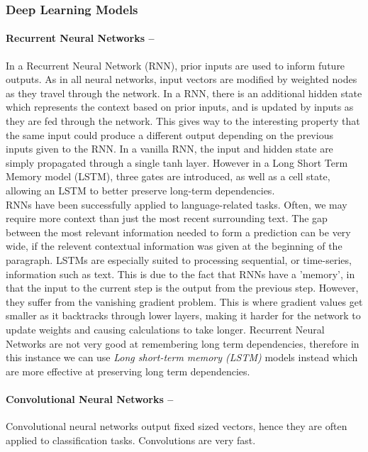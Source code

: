 \documentclass[12pt,a4paper]{article}
\begin{document}
\subsubsection{Deep Learning Models}
\paragraph{Recurrent Neural Networks --}
In a Recurrent Neural Network (RNN), prior inputs are used to inform future outputs. As in all neural networks, input vectors are modified by weighted nodes as they travel through the network. In a RNN, there is an additional hidden state which represents the context based on prior inputs, and is updated by inputs as they are fed through the network. This gives way to the interesting property that the same input could produce a different output depending on the previous inputs given to the RNN. In a vanilla RNN, the input and hidden state are simply propagated through a single tanh layer. However in a Long Short Term Memory model (LSTM), three gates are introduced, as well as a cell state, allowing an LSTM to better preserve long-term dependencies.\\

RNNs have been successfully applied to language-related tasks. Often, we may require more context than just the most recent surrounding text. The gap between the most relevant information needed to form a prediction can be very wide, if the relevent contextual information was given at the beginning of the paragraph. LSTMs are especially suited to processing sequential, or time-series, information such as text. This is due to the fact that RNNs have a 'memory', in that the input to the current step is the output from the previous step. However, they suffer from the vanishing gradient problem. This is where gradient values get smaller as it backtracks through lower layers, making it harder for the network to update weights and causing calculations to take longer. Recurrent Neural Networks are not very good at remembering long term dependencies, therefore in this instance we can use \textit{Long short-term memory (LSTM)} models \cite{hochreiter1997long} instead which are more effective at preserving long term dependencies.

\paragraph{Convolutional Neural Networks --}

Convolutional neural networks output fixed sized vectors, hence they are often applied to classification tasks. Convolutions are very fast.
\end{document}
